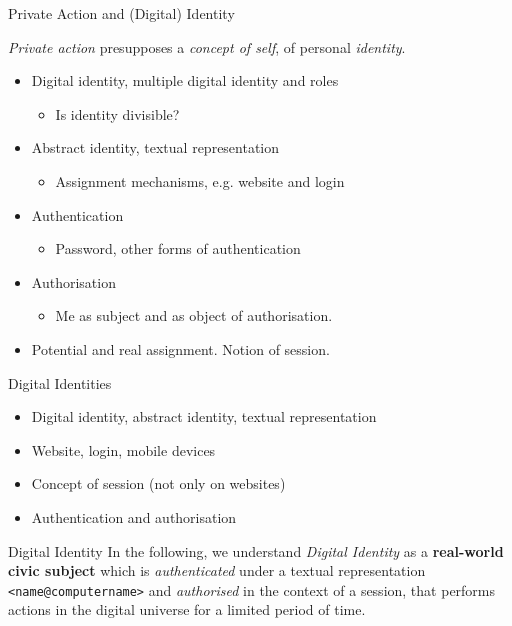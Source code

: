 \documentclass{beamer}
\begin{document}
\begin{frame}{Private Action and (Digital) Identity}

\emph{Private action} presupposes a \emph{concept of self}, of personal
\emph{identity}.
\begin{itemize}
\item Digital identity, multiple digital identity and roles
  \begin{itemize}
  \item[] Is identity divisible?
  \end{itemize}
\item Abstract identity, textual representation
  \begin{itemize}
  \item[] Assignment mechanisms, e.g. website and login
  \end{itemize}
\item Authentication
  \begin{itemize}
  \item[] Password, other forms of authentication
  \end{itemize}
\item Authorisation
  \begin{itemize}
  \item[] Me as subject and as object of authorisation.
  \end{itemize}
\item Potential and real assignment. Notion of session.
\end{itemize}
\end{frame}
\begin{frame}{Digital Identities}
\begin{itemize}
\item Digital identity, abstract identity, textual representation
\item Website, login, mobile devices
\item Concept of session (not only on websites)
\item Authentication and authorisation
\end{itemize}
\begin{block}{Digital Identity}
  In the following, we understand \emph{Digital Identity} as a
  \textbf{real-world civic subject} which is \emph{authenticated} under a
  textual representation \texttt{<name@computername>} and \emph{authorised} in
  the context of a session, that performs actions in the digital universe for
  a limited period of time.
\end{block}
\end{frame}
\end{document}

